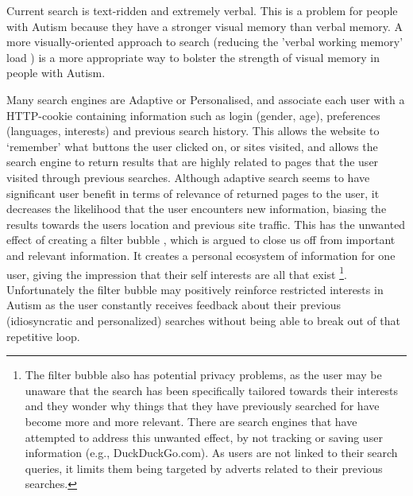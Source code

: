 \documentclass[a4paper, 10pt]{article}
\begin{document}
Current search is text-ridden and extremely verbal. This is a problem for people with Autism because they have a stronger visual memory \cite{fabienne} than verbal memory. A more visually-oriented approach to search (reducing the 'verbal working memory' load \cite{workingmem}) is a more appropriate way to bolster the strength of visual memory in people with Autism.

Many search engines are Adaptive or Personalised, and associate each user with a HTTP-cookie containing information such as login (gender, age), preferences (languages, interests) and previous search history. This allows the website to ‘remember’ what buttons the user clicked on, or sites visited, and allows the search engine to return results that are highly related to pages that the user visited through previous searches. Although adaptive search seems to have significant user benefit in terms of relevance of returned pages to the user, it decreases the likelihood that the user encounters new information, biasing the results towards the users location and previous site traffic.  This has the unwanted effect of creating a filter bubble \cite{Pariser}, which is argued to close us off from important and relevant information. It creates a personal ecosystem of information for one user, giving the impression that their self interests are all that exist \footnote{The filter bubble also has potential privacy problems, as the user may be unaware that the search has been specifically tailored towards their interests and they wonder why things that they have previously searched for have become more and more relevant. There are search engines that have attempted to address this unwanted effect, by not tracking or saving user information (e.g., DuckDuckGo.com). As users are not linked to their search queries, it limits them being targeted by adverts related to their previous searches.}. Unfortunately the filter bubble may positively reinforce restricted interests in Autism as the user constantly receives feedback about their previous (idiosyncratic and personalized) searches without being able to break out of that repetitive loop. 
\end{document}
